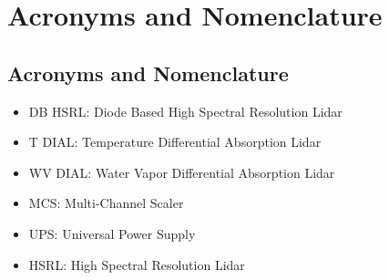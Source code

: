 
\chapter{Acronyms and Nomenclature}
\label{CH-Acronyms}

\section{Acronyms and Nomenclature}

\begin{itemize}
\item{DB HSRL: Diode Based High Spectral Resolution Lidar}
\item{T DIAL: Temperature Differential Absorption Lidar}
\item{WV DIAL: Water Vapor Differential Absorption Lidar}
\item{MCS: Multi-Channel Scaler}
\item{UPS: Universal Power Supply}
\item{HSRL: High Spectral Resolution Lidar}
\end{itemize}
\newpage    
